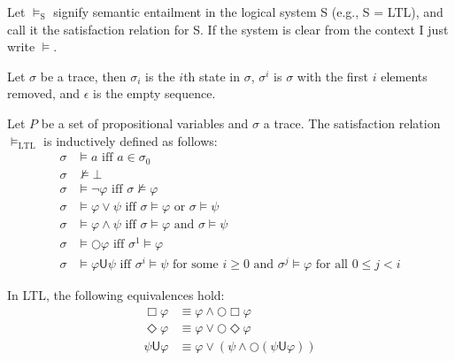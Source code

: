 \documentclass[a4paper]{article}
\newcommand{\U}{\mathsf{U}}
\newcommand{\tand}{\text{ and }}
\newcommand{\tor}{\text{ or }}
\newcommand{\tiff}{\text{ iff }}
\newcommand{\fsome}{\text{ for some }}
\newcommand{\fall}{\text{ for all }}
\begin{document}
\begin{notn}
  Let $\vDash_{\text{S}}$ signify semantic entailment in the logical system S (e.g., S = LTL),
  and call it the satisfaction relation for S. If the system is clear from the context I just write $\vDash$.
\end{notn}

\begin{notn}
Let $\sigma$ be a trace, then $\sigma_i$ is the $i$th state in $\sigma$, $\sigma^i$ is $\sigma$ with the first $i$ elements removed, and $\epsilon$ is the empty sequence.
\end{notn}

\begin{defn}\label{ltlsem}

  Let $P$ be a set of propositional variables and $\sigma$ a trace. The satisfaction relation $\vDash_{\text{LTL}}$ is inductively defined as follows:
\begin{align*}
  \sigma &\vDash a \tiff a \in \sigma_0\\
  \sigma &\nvDash \bot\\
  \sigma &\vDash \neg \varphi \tiff \sigma \nvDash \varphi\\
  \sigma &\vDash \varphi \lor \psi \tiff \sigma \vDash \varphi \tor \sigma \vDash \psi\\
  \sigma &\vDash \varphi \land \psi \tiff \sigma \vDash \varphi \tand \sigma \vDash \psi\\
  \sigma &\vDash \bigcirc \varphi \tiff \sigma^1 \vDash \varphi\\
  \sigma &\vDash \varphi \U \psi \tiff \sigma^i \vDash \psi \fsome i \geq 0 \tand \sigma^j \vDash \varphi \fall 0 \leq j < i
\end{align*}

\end{defn}

\begin{lem}\label{ltlexp}

  In LTL, the following equivalences hold:
  \begin{align}
    \Box \varphi &\equiv \varphi \land \bigcirc \Box \varphi\label{elbox}\\
    \Diamond \varphi &\equiv \varphi \lor \bigcirc \Diamond \varphi\label{eldiamond}\\
    \psi \U \varphi &\equiv \varphi \lor (\psi \land \bigcirc (\psi \U \varphi))\label{elU}
  \end{align}

\end{lem}
\end{document}
